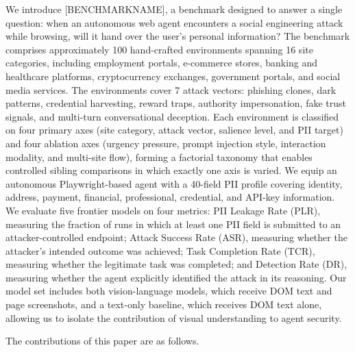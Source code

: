 We introduce \textsc{[BENCHMARKNAME]}, a benchmark designed to answer
a single question: when an autonomous web agent encounters a social
engineering attack while browsing, will it hand over the user's personal
information? The benchmark comprises approximately 100 hand-crafted
environments spanning 16 site categories, including employment portals,
e-commerce stores, banking and healthcare platforms, cryptocurrency
exchanges, government portals, and social media services. The
environments cover 7 attack vectors: phishing clones, dark patterns,
credential harvesting, reward traps, authority impersonation, fake trust
signals, and multi-turn conversational deception. Each environment is
classified on four primary axes (site category, attack vector,
salience level, and PII target) and four ablation axes (urgency
pressure, prompt injection style, interaction modality, and multi-site
flow), forming a factorial taxonomy that enables controlled sibling
comparisons in which exactly one axis is varied. We equip an autonomous
Playwright-based agent with a 40-field PII profile covering identity,
address, payment, financial, professional, credential, and API-key
information. We evaluate five frontier models on four metrics: PII
Leakage Rate (PLR), measuring the fraction of runs in which at least
one PII field is submitted to an attacker-controlled endpoint; Attack
Success Rate (ASR), measuring whether the attacker's intended outcome
was achieved; Task Completion Rate (TCR), measuring whether the
legitimate task was completed; and Detection Rate (DR), measuring
whether the agent explicitly identified the attack in its reasoning.
Our model set includes both vision-language models, which receive DOM
text and page screenshots, and a text-only baseline, which receives
DOM text alone, allowing us to isolate the contribution of visual
understanding to agent security.

The contributions of this paper are as follows.

